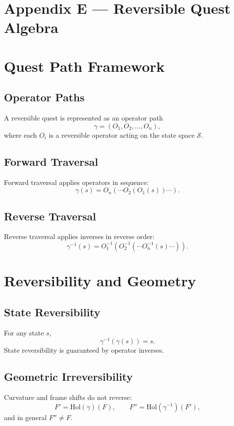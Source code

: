 \appendix
\section*{Appendix E — Reversible Quest Algebra}

\section{Quest Path Framework}

\subsection{Operator Paths}
A reversible quest is represented as an operator path
\[
\gamma = (O_1, O_2, \ldots, O_n),
\]
where each $O_i$ is a reversible operator acting on the state space
$\mathcal{S}$.

\subsection{Forward Traversal}
Forward traversal applies operators in sequence:
\[
\gamma(s) = O_n(\cdots O_2(O_1(s))\cdots).
\]

\subsection{Reverse Traversal}
Reverse traversal applies inverses in reverse order:
\[
\gamma^{-1}(s)
    = O_1^{-1}(O_2^{-1}(\cdots O_n^{-1}(s)\cdots)).
\]

\section{Reversibility and Geometry}

\subsection{State Reversibility}
For any state $s$,
\[
\gamma^{-1}(\gamma(s)) = s.
\]
State reversibility is guaranteed by operator inverses.

\subsection{Geometric Irreversibility}
Curvature and frame shifts do not reverse:
\[
F' = \mathrm{Hol}(\gamma)(F),
\qquad
F'' = \mathrm{Hol}(\gamma^{-1})(F'),
\]
and in general $F'' \neq F$.

